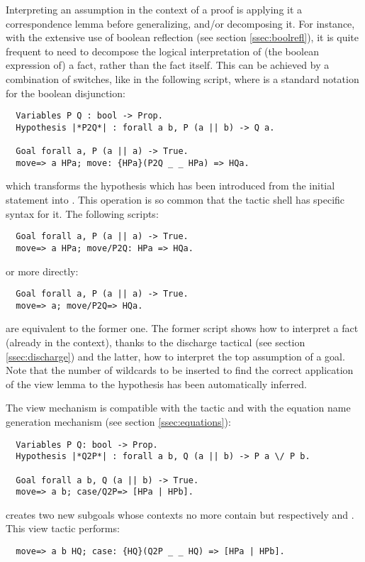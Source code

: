 Interpreting an assumption in the context of a proof is applying it a
correspondence lemma before generalizing, and/or decomposing it.
For instance, with the extensive use of boolean reflection (see
section \ref{ssec:boolrefl}), it is
quite frequent to need to decompose the logical interpretation of (the
boolean expression of) a
fact, rather than the fact itself.
This can be achieved by a combination of 
switches, like in the following script, where \C{||} is a standard
  \Coq{} notation for the boolean disjunction:
\begin{lstlisting}
  Variables P Q : bool -> Prop.
  Hypothesis |*P2Q*| : forall a b, P (a || b) -> Q a.

  Goal forall a, P (a || a) -> True.
  move=> a HPa; move: {HPa}(P2Q _ _ HPa) => HQa.
\end{lstlisting}
which transforms the hypothesis  which has been
introduced from the initial statement into .
This operation is so common that the tactic shell has
specific syntax for it.
The following scripts:
\begin{lstlisting}
  Goal forall a, P (a || a) -> True.
  move=> a HPa; move/P2Q: HPa => HQa.
\end{lstlisting}
or more directly:
\begin{lstlisting}
  Goal forall a, P (a || a) -> True.
  move=> a; move/P2Q=> HQa.
\end{lstlisting}
are equivalent to the former one. The former script shows how to
interpret a fact (already in the context), thanks to the discharge
tactical (see section \ref{ssec:discharge}) and the latter, how to
interpret the top assumption of a goal. Note
that the number of wildcards to be inserted to find the correct
application of the view lemma to the hypothesis has been automatically
inferred.

The view mechanism is compatible with the  tactic and with the
equation name generation mechanism (see section \ref{ssec:equations}):
\begin{lstlisting}
  Variables P Q: bool -> Prop.
  Hypothesis |*Q2P*| : forall a b, Q (a || b) -> P a \/ P b.

  Goal forall a b, Q (a || b) -> True.
  move=> a b; case/Q2P=> [HPa | HPb].
\end{lstlisting}
creates two new subgoals whose contexts no more contain
 but respectively  and
. This view tactic
performs:
\begin{lstlisting}
  move=> a b HQ; case: {HQ}(Q2P _ _ HQ) => [HPa | HPb].
\end{lstlisting}

